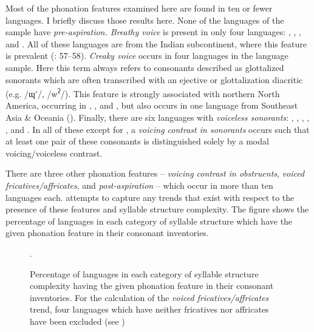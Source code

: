   Most of the phonation features examined here are found in ten or fewer languages. I briefly discuss those results here. None of the languages of the sample have \textit{pre-aspiration. Breathy voice} is present in only four languages: , , , and . All of these languages are from the Indian subcontinent, where this feature is prevalent (\citealt{LadefogedMaddieson1996}: 57--58). \textit{Creaky voice} occurs in four languages in the language sample. Here this term always refers to consonants described as glottalized sonorants which are often transcribed with an ejective or glottalization diacritic (e.g. /ɰ’/, /w\textsuperscript{ʔ}/). This feature is strongly associated with northern North America, occurring in , , and , but also occurs in one language from Southeast Asia \& Oceania (). Finally, there are six languages with \textit{voiceless sonorants}: , , , , , and . In all of these except for , a \textit{voicing contrast in sonorants} occurs such that at least one pair of these consonants is distinguished solely by a modal voicing/voiceless contrast.

  There are three other phonation features -- \textit{voicing contrast in obstruents}, \textit{voiced fricatives/affricates}, and \textit{post-aspiration} -- which occur in more than ten languages each.  attempts to capture any trends that exist with respect to the presence of these features and syllable structure complexity. The figure shows the percentage of languages in each category of syllable structure which have the given phonation feature in their consonant inventories.

\begin{figure}
\caption{\label{fig:4.5}Percentage of languages in each category of syllable structure complexity having the given phonation feature in their consonant inventories. For the calculation of the \textit{voiced fricatives/affricates} trend, four languages which have neither fricatives nor affricates have been excluded (see )}.
\end{figure}

